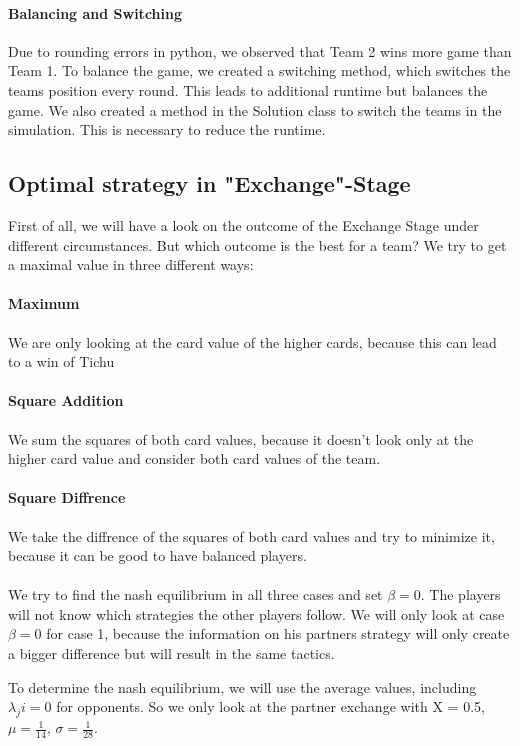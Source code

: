 \paragraph{Balancing and Switching}
Due to rounding errors in python, we observed that Team 2 wins more game than Team 1. 
To balance the game, we created a switching method, which switches the teams position every round. This leads to additional runtime but balances the game. 
We also created a method in the Solution class to switch the teams in the simulation. This is necessary to reduce the runtime. 

\subsection{Optimal strategy in "Exchange"-Stage}

First of all, we will have a look on the outcome of the Exchange Stage under different circumstances. But which outcome is the best for a team? We try to get a maximal value in three different ways:

\paragraph{Maximum}  We are only looking at the card value of the higher cards, because this can lead to a win of Tichu
\paragraph{Square Addition}  We sum the squares of both card values, because it doesn’t look only at the higher card value and consider both card values of the team.
\paragraph{Square Diffrence} We take the diffrence of the squares of both card values and try to minimize it, because it can be good to have balanced players. 
\\
\\
We try to find the nash equilibrium in all three cases and set $\beta = 0$. The players will not know which strategies the other players follow. We will only look at case $\beta = 0$ for case 1, because the information on his partners strategy will only create a bigger difference but will result in the same tactics. 

To determine the nash equilibrium, we will use the average values, including $\lambda_ji = 0$ for opponents. So we only look at the partner exchange with X = 0.5, $\mu = \frac{1}{14}$, $\sigma = \frac{1}{28}$.

